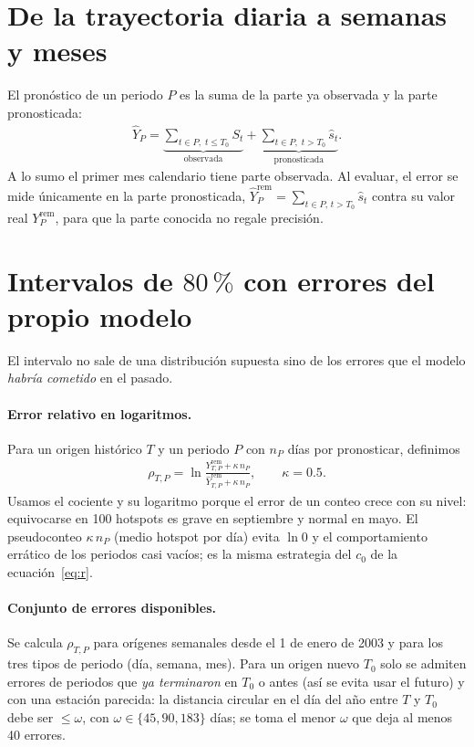 \section{De la trayectoria diaria a semanas y meses}

El pronóstico de un periodo $P$ es la suma de la parte ya observada y la parte pronosticada:
\begin{align*}
  \widehat Y_P=\underbrace{\sum_{t\in P,\;t\le T_0}S_t}_{\text{observada}}+\underbrace{\sum_{t\in P,\;t>T_0}\widehat s_t}_{\text{pronosticada}}.
\end{align*}
A lo sumo el primer mes calendario tiene parte observada. Al evaluar, el error se mide únicamente en la parte pronosticada, $\widehat Y^{\mathrm{rem}}_P=\sum_{t\in P,\,t>T_0}\widehat s_t$ contra su valor real $Y^{\mathrm{rem}}_P$, para que la parte conocida no regale precisión.

\section{Intervalos de \texorpdfstring{$80\,\%$}{80 \%} con errores del propio modelo}\label{sec:interv}

El intervalo no sale de una distribución supuesta sino de los errores que el modelo \emph{habría cometido} en el pasado.

\paragraph{Error relativo en logaritmos.} Para un origen histórico $T$ y un periodo $P$ con $n_P$ días por pronosticar, definimos
\begin{align*}
  \rho_{T,P}=\ln\frac{Y^{\mathrm{rem}}_{T,P}+\kappa\,n_P}{\widehat Y^{\mathrm{rem}}_{T,P}+\kappa\,n_P},\qquad\kappa=0.5.
\end{align*}
Usamos el cociente y su logaritmo porque el error de un conteo crece con su nivel: equivocarse en 100 hotspots es grave en septiembre y normal en mayo. El pseudoconteo $\kappa\,n_P$ (medio hotspot por día) evita $\ln0$ y el comportamiento errático de los periodos casi vacíos; es la misma estrategia del $c_0$ de la ecuación~\eqref{eq:r}.

\paragraph{Conjunto de errores disponibles.} Se calcula $\rho_{T,P}$ para orígenes semanales desde el 1 de enero de 2003 y para los tres tipos de periodo (día, semana, mes). Para un origen nuevo $T_0$ solo se admiten errores de periodos que \emph{ya terminaron} en $T_0$ o antes (así se evita usar el futuro) y con una estación parecida: la distancia circular en el día del año entre $T$ y $T_0$ debe ser $\le\omega$, con $\omega\in\{45,90,183\}$ días; se toma el menor $\omega$ que deja al menos 40 errores.

